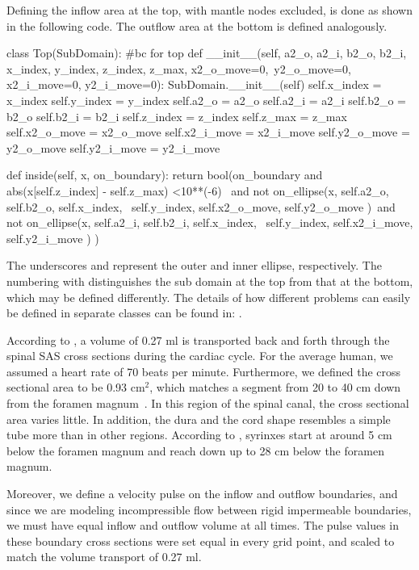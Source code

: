 Defining the inflow area at the top, with mantle nodes excluded, is done as shown in the following code. The outflow area at the bottom is defined analogously.

\begin{python}
class Top(SubDomain):	#bc for top
	def __init__(self, a2_o, a2_i, b2_o, b2_i,  x_index, y_index, z_index, z_max, x2_o_move=0,\
				 y2_o_move=0, x2_i_move=0, y2_i_move=0):
		SubDomain.__init__(self)
		self.x_index = x_index
		self.y_index = y_index
		self.a2_o = a2_o
		self.a2_i = a2_i
		self.b2_o = b2_o
		self.b2_i = b2_i
		self.z_index = z_index
		self.z_max = z_max
		self.x2_o_move = x2_o_move
		self.x2_i_move = x2_i_move
		self.y2_o_move = y2_o_move
		self.y2_i_move = y2_i_move

	def inside(self, x, on_boundary):
		return bool(on_boundary and abs(x[self.z_index] - self.z_max) <10**(-6) \
                       and not on_ellipse(x, self.a2_o, self.b2_o, self.x_index,  \
                           self.y_index, self.x2_o_move, self.y2_o_move )\
                       and not on_ellipse(x, self.a2_i, self.b2_i, self.x_index, \
                           self.y_index, self.x2_i_move, self.y2_i_move ) )
\end{python}

The underscores \emp{o} and \emp{i} represent the outer and inner
ellipse, respectively. The numbering with \emp{2} distinguishes the sub
domain at the top from that at the bottom, which may be defined
differently. The details of how different problems can easily be
defined in separate classes can be found in:
\emp{src/mesh\_definitions/}. %


According to \cite{GuptaSoellingerBoesigerEtAl2009}, a volume of 0.27 ml is transported back and forth through the spinal SAS cross sections during the cardiac cycle. For the average human, we assumed a heart rate of 70 beats per minute. Furthermore, we defined the cross sectional area to be 0.93 $\mathrm{cm^2}$, which matches a segment from 20 to 40 cm down from the foramen magnum~\cite{LothYardimciAlperin2001}. In this region of the spinal canal, the cross sectional area varies little. In addition, the dura and the cord shape resembles a simple tube more than in other regions. According to \cite{OldfieldMuraszkoShawkerEtAl1994}, syrinxes start at around 5 cm below the foramen magnum and reach down up to 28 cm below the foramen magnum.

Moreover, we define a velocity pulse on the inflow and outflow
boundaries, and since we are modeling incompressible flow between rigid
impermeable boundaries, we must have equal inflow and outflow volume
at all times. The pulse values in these boundary cross sections were
set equal in every grid point, and scaled to match the volume
transport of 0.27 ml.

